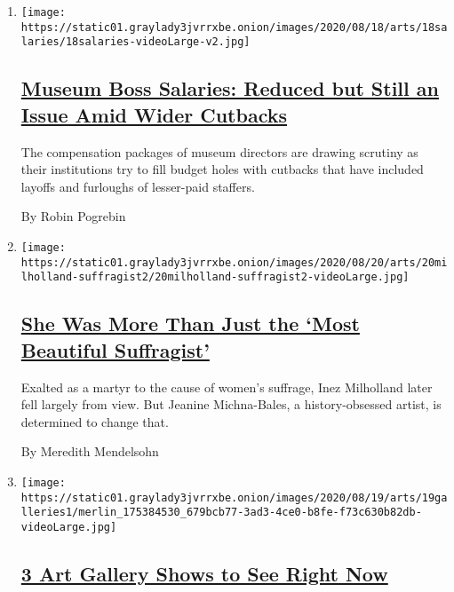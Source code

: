 \begin{enumerate}
\def\labelenumi{\arabic{enumi}.}
\item
  \texttt{[image: https://static01.graylady3jvrrxbe.onion/images/2020/08/18/arts/18salaries/18salaries-videoLarge-v2.jpg]}

  \hypertarget{museum-boss-salaries-reduced-but-still-an-issue-amid-wider-cutbacks}{%
  \subsection{\texorpdfstring{\href{/2020/08/18/arts/design/museum-leader-salaries-pay-disparity.html}{Museum
  Boss Salaries: Reduced but Still an Issue Amid Wider
  Cutbacks}}{Museum Boss Salaries: Reduced but Still an Issue Amid Wider Cutbacks}}\label{museum-boss-salaries-reduced-but-still-an-issue-amid-wider-cutbacks}}

  The compensation packages of museum directors are drawing scrutiny as
  their institutions try to fill budget holes with cutbacks that have
  included layoffs and furloughs of lesser-paid staffers.

  By Robin Pogrebin
\item
  \texttt{[image: https://static01.graylady3jvrrxbe.onion/images/2020/08/20/arts/20milholland-suffragist2/20milholland-suffragist2-videoLarge.jpg]}

  \hypertarget{she-was-more-than-just-the-most-beautiful-suffragist}{%
  \subsection{\texorpdfstring{\href{/2020/08/19/arts/design/inez-milholland-suffragist.html}{She
  Was More Than Just the `Most Beautiful
  Suffragist'}}{She Was More Than Just the `Most Beautiful Suffragist'}}\label{she-was-more-than-just-the-most-beautiful-suffragist}}

  Exalted as a martyr to the cause of women's suffrage, Inez Milholland
  later fell largely from view. But Jeanine Michna-Bales, a
  history-obsessed artist, is determined to change that.

  By Meredith Mendelsohn
\item
  \texttt{[image: https://static01.graylady3jvrrxbe.onion/images/2020/08/19/arts/19galleries1/merlin\_175384530\_679bcb77-3ad3-4ce0-b8fe-f73c630b82db-videoLarge.jpg]}

  \hypertarget{3-art-gallery-shows-to-see-right-now}{%
  \subsection{\texorpdfstring{\href{/2020/08/19/arts/design/3-art-gallery-shows-to-see-right-now.html}{3
  Art Gallery Shows to See Right
  Now}}{3 Art Gallery Shows to See Right Now}}\label{3-art-gallery-shows-to-see-right-now}}


\end{enumerate}
